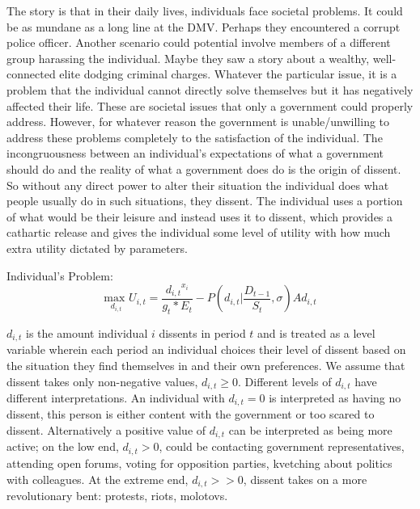 \documentclass[12pt]{article}
\begin{document}
\begin{spacing}{1.5}
The story is that in their daily lives, individuals face societal problems. It could be as mundane as a long line at the DMV. Perhaps they encountered a corrupt police officer. Another scenario could potential involve members of a different group harassing the individual. Maybe they saw a story about a wealthy, well-connected elite dodging criminal charges. Whatever the particular issue, it is a problem that the individual cannot directly solve themselves but it has negatively affected their life. These are societal issues that only a government could properly address. However, for whatever reason the government is unable/unwilling to address these problems completely to the satisfaction of the individual. The incongruousness between an individual's expectations of what a government should do and the reality of what a government does do is the origin of dissent. So without any direct power to alter their situation the individual does what people usually do in such situations, they dissent. The individual uses a portion of what would be their leisure and instead uses it to dissent, which provides a cathartic release and gives the individual some level of utility with how much extra utility dictated by parameters.

\vspace{.5 em}
\noindent Individual's Problem:
\begin{equation}
{\underset{d_{i,t}}{\text{max }}}  U_{i,t}= \frac{{d_{i,t}}^{{x}_i}}{g_t * E_t} - P \left(d_{i,t} \Biggl|\frac{D_{t-1}}{S_t},\sigma \right)Ad_{i,t}
\end{equation}

$ d_{i,t} $ is the amount individual $i$ dissents in period $t$ and is treated as a level variable wherein each period an individual choices their level of dissent based on the situation they find themselves in and their own preferences. We assume that dissent takes only non-negative values, $d_{i,t}\geq0$. Different levels of $d_{i,t}$ have different interpretations. An individual with $d_{i,t}=0$ is interpreted as having no dissent, this person is either content with the government or too scared to dissent. Alternatively a positive value of $d_{i,t}$ can be interpreted as being more active; on the low end, $d_{i,t}>0$, could be contacting government representatives, attending open forums, voting for opposition parties, kvetching about politics with colleagues. At the extreme end, $d_{i,t}>>0$, dissent takes on a more revolutionary bent: protests, riots, molotovs.  


\end{spacing}
\end{document}

